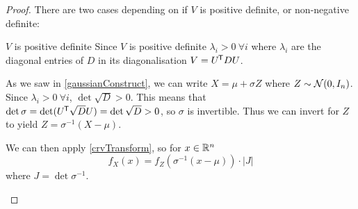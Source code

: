 \documentclass[../main.tex]{subfiles}
\begin{document}
\begin{proof}
  There are two cases depending on if $V$ is positive definite, or non-negative definite:
  \begin{proofcases}
    \begin{case}{$V$ is positive definite}
      Since $V$ is positive definite $\lambda_i > 0\ \forall i$ where $\lambda_i$ are the diagonal entries of $D$ in its diagonalisation $V = U^{{\mkern-1.5mu\mathsf{T}}}DU$.

      As we saw in \cref{gaussianConstruct}, we can write $X = \mu + \sigma Z$ where $Z \sim \operatorname{\mathcal{N}}(0, I_n)$.
      Since $\lambda_i > 0\ \forall i$, $\det \sqrt{D} > 0$.
      This means that $\det \sigma = \det (U^{{\mkern-1.5mu\mathsf{T}}} \sqrt{D} U) = \det \sqrt{D} > 0$, so $\sigma$ is invertible.
      Thus we can invert for $Z$ to yield $Z = \sigma^{-1}(X - \mu)$.

      We can then apply \cref{crvTransform}, so for $x \in \mathbb{R}^{n}$
      \[
        f_{X}(x) = f_{Z}(\sigma^{-1} (x - \mu)) \cdot |J|
      \]
      where $J = \det \sigma^{-1}$.


\end{case}
\end{proofcases}
\end{proof}
\end{document}
